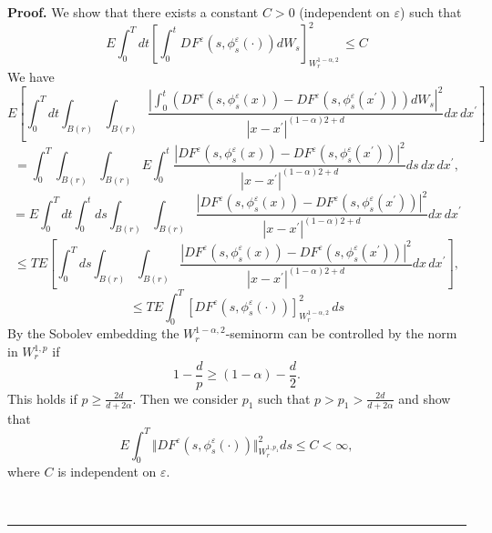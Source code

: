 \documentclass{article}
\newcommand{\eps}{\varepsilon}
\newenvironment{proof}[1][Proof]{\noindent\textbf{#1.} }{\ \rule{0.5em}{0.5em}}
\begin{document}
\begin{proof}
 We show  that  there exists  a constant $C>0$ (independent on  $\eps$)
 such that
\begin{equation}
E \int_{0}^{T} dt \left [ \int_{0}^{t}D^{}F^{\varepsilon }\left(
s,{\phi }_{s}^{\eps}\left( \cdot\right) \right) dW_{s}\right
]_{W_{r}^{1-\alpha,2}}^{2} \, \leq C \label{cia2}
\end{equation}
 We have
$$
E\left[
\int_{0}^{T}dt\int_{B(r)}\int_{B(r)}\frac{|\int_{0}^{t}(DF^{\varepsilon
}\left( s,{\phi}_s^{\varepsilon} \left( x\right) \right)
-DF^{\varepsilon }\left( s, {\phi}_s^{\varepsilon}\left( x^{\prime
}\right) \right) )dW_{s}|^{2}}{|x-x^{\prime }|^{(1 - \alpha)2 + d
}}dx\,dx^{\prime }\right]
$$
$$
= \int_{0}^{T}    \int_{B(r)}\int_{B(r)} E
\int_{0}^{t}\frac{|DF^{\varepsilon }\left(
s,{\phi}_s^{\varepsilon}\left( x\right) \right) -DF^{\varepsilon
}\left( s,{\phi}_s^{\varepsilon}\left( x^{\prime }\right) \right)
|^{2}}{|x-x^{\prime }|^{(1 - \alpha)2 + d } }ds \,  dx\,dx^{\prime }
,
$$
\begin{equation*}
=  E \int_{0}^{T}dt  \int_{0}^{t}ds
\int_{B(r)}\int_{B(r)}\frac{|DF^{\varepsilon }\left(
s,{\phi}_s^{\varepsilon}\left( x\right) \right) -DF^{\varepsilon
}\left( s,{\phi}_s^{\varepsilon}\left( x^{\prime }\right) \right)
|^{2}}{|x-x^{\prime }|^{(1 - \alpha)2 + d } }dx\,dx^{\prime }
\end{equation*}
\begin{equation*}
\leq TE\left[ \int_{0}^{T}ds\int_{B(r)}\int_{B(r)}\frac{|DF^{\varepsilon }\left( s,%
{\phi}_s^{\varepsilon}\left( x\right) \right) -DF^{\varepsilon
}\left( s, {\phi}^{\varepsilon}_{s}\left( x^{\prime }\right) \right)
|^{2}}{|x-x^{\prime }|^{(1 - \alpha)2 + d} }dx\,dx^{\prime }\right]
,
\end{equation*}
\begin{equation*}
\leq TE\int_{0}^{T} [ DF^{\varepsilon
}(s,{\phi}^{\varepsilon}_{s}(\cdot ))]_{W_{r}^{1 - \alpha, 2}}^{2}
\, ds
\end{equation*}
By the Sobolev embedding the $W^{1 - \alpha,2}_r$-seminorm  can be
controlled by the norm in $W^{1,p}_r$ if
$$
 1 - \frac{d}{p} \ge (1-\alpha) - \frac{d}{2}.
$$
This holds if $p \ge \frac{2d}{ d + 2 \alpha}$.
 Then we consider $p_{1} $ such that
$ p>{p_{1}}> \frac{2d}{ d + 2 \alpha} $
 and show that
\begin{equation} \label{f7}
E\int_{0}^{T}\Vert DF^{\varepsilon
}(s,{\phi}^{\varepsilon}_{s}(\cdot ))\Vert _{W_{r}^{1,p_{1}}}^{2}ds
\le C < \infty,
\end{equation}
where $C$ is independent on $\eps$.


\end{proof}
\end{document}
